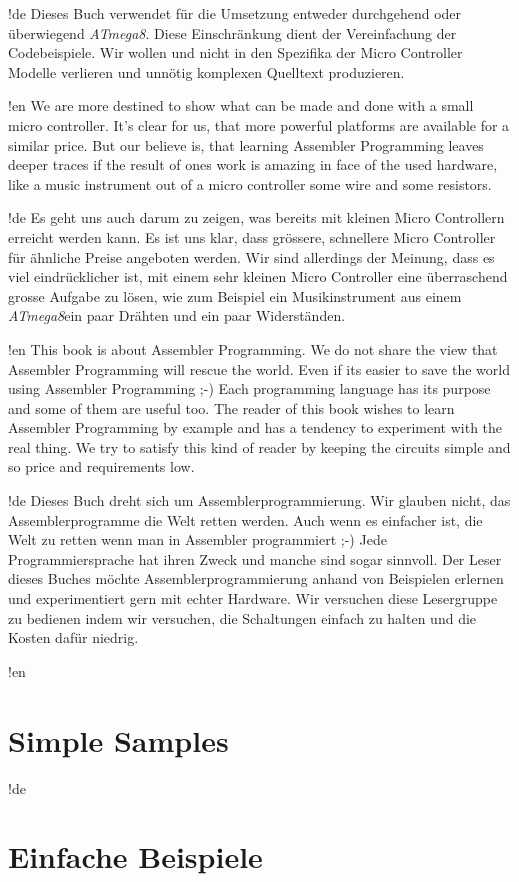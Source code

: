 \documentclass[twoside,12pt,authoryear,openright]{book}
\newcommand{\at}{\textit{ATmega8}}
\begin{document}
!de Dieses Buch verwendet für die Umsetzung entweder durchgehend oder überwiegend \at. Diese Einschränkung dient der Vereinfachung der Codebeispiele. Wir wollen und nicht in den Spezifika der Micro Controller Modelle verlieren und unnötig komplexen Quelltext produzieren.



!en We are more destined to show what can be made and done with a small micro controller. It's clear for us, that more powerful platforms are available for a similar price. But our believe is, that learning Assembler Programming leaves deeper traces if the result of ones work is amazing in face of the used hardware, like a music instrument out of a micro controller some wire and some resistors.

!de Es geht uns auch darum zu zeigen, was bereits mit kleinen Micro Controllern erreicht werden kann. Es ist uns klar, dass grössere, schnellere Micro Controller für ähnliche Preise angeboten werden. Wir sind allerdings der Meinung, dass es viel eindrücklicher ist, mit einem sehr kleinen Micro Controller eine überraschend grosse Aufgabe zu lösen, wie zum Beispiel ein Musikinstrument aus einem \at ein paar Drähten und ein paar Widerständen.



!en This book is about Assembler Programming. We do not share the view that Assembler Programming will rescue the world. Even if its easier to save the world using Assembler Programming ;-) Each programming language has its purpose and some of them are useful too. The reader of this book wishes to learn Assembler Programming by example and has a tendency to experiment with the real thing. We try to satisfy this kind of reader by keeping the circuits simple and so price and requirements low.

!de Dieses Buch dreht sich um Assemblerprogrammierung. Wir glauben nicht, das Assemblerprogramme die Welt retten werden. Auch wenn es einfacher ist, die Welt zu retten wenn man in Assembler programmiert ;-) Jede Programmiersprache hat ihren Zweck und manche sind sogar sinnvoll. Der Leser dieses Buches möchte Assemblerprogrammierung anhand von Beispielen erlernen und experimentiert gern mit echter Hardware. Wir versuchen diese Lesergruppe zu bedienen indem wir versuchen, die Schaltungen einfach zu halten und die Kosten dafür niedrig.

\tableofcontents{}
\listoffigures{}
\listoftables{}

!en \part{Simple Samples}
!de \part{Einfache Beispiele}
\end{document}
